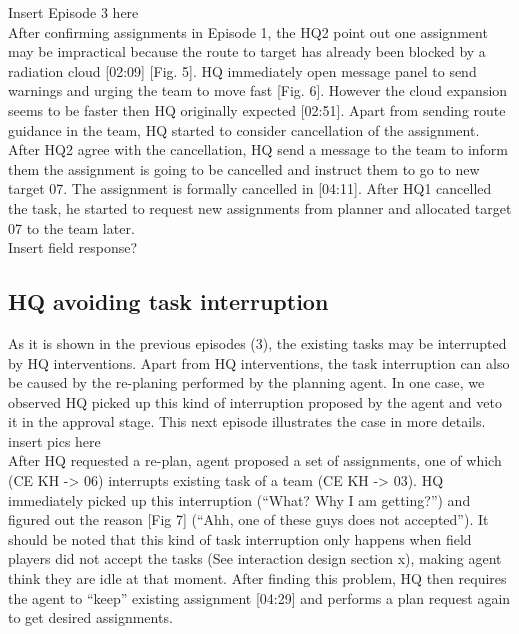Insert Episode 3 here\\

After confirming assignments in Episode 1, the HQ2 point out one assignment may be impractical because the route to target has already been blocked by a radiation cloud [02:09] [Fig. 5]. HQ immediately open message panel to send warnings and urging the team to move fast [Fig. 6]. However the cloud expansion seems to be faster then HQ originally expected [02:51]. Apart from sending route guidance in the team, HQ started to consider cancellation of the assignment. After HQ2 agree with the cancellation, HQ send a message to the team to inform them the assignment is going to be cancelled and instruct them to go to new target 07. The assignment is formally cancelled in [04:11]. After HQ1 cancelled the task, he started to request new assignments from planner and allocated target 07 to the team later. \\

Insert field response?\\

\subsection{HQ avoiding task interruption}
As it is shown in the previous episodes (3), the existing tasks may be interrupted by HQ interventions. Apart from HQ interventions, the task interruption can also be caused by the re-planing performed by the planning agent. In one case, we observed HQ picked up this kind of interruption proposed by the agent and veto it in the approval stage. This next episode illustrates the case in more details. \\

insert pics here\\

After HQ requested a re-plan, agent proposed a set of assignments, one of which (CE KH -> 06) interrupts existing task of a team (CE KH -> 03). HQ immediately picked up this interruption (``What? Why I am getting?'') and figured out the reason [Fig 7] (``Ahh, one of these guys does not accepted''). It should be noted that this kind of task interruption only happens when field players did not accept the tasks (See interaction design section x), making agent think they are idle at that moment. After finding this problem, HQ then requires the agent to ``keep'' existing assignment [04:29] and performs a plan request again to get desired assignments. \\


